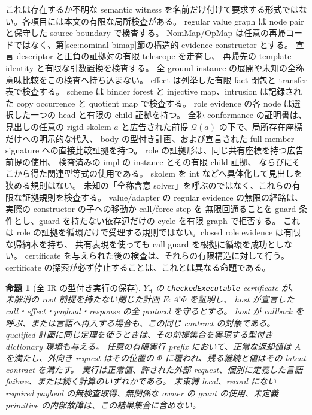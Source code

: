 \documentclass[11pt,a4paper]{article}
\newtheorem{theorem}{命題}[section]
\theoremstyle{remark}
\begin{document}
これは存在するか不明な semantic witness を名前だけ付けて要求する形式ではない。各項目には本文の有限な局所検査がある。
regular value graph は node pair と保守した source boundary で検査する。
NomMap/OpMap は任意の再帰コードではなく、第\ref{sec:nominal-bimap}節の構造的 evidence constructor とする。
宣言 descriptor と正負の証拠対の有限 telescope を走査し、
再帰先の template identity と有限な引数置換を検査する。
全 ground instance の展開や未知の全称意味比較をこの検査へ持ち込まない。
effect は列挙した有限 fact 閉包と transfer 表で検査する。
scheme は binder forest と injective map、intrusion は記録された copy occurrence と quotient map で検査する。
role evidence の各 node は選択した一つの head と有限の child 証拠を持つ。
全称 conformance の証明書は、見出しの任意の rigid skolem \(\bar a\) と広告された前提
\(\mathcal Q(\bar a)\) の下で、局所存在座標だけへの明示的な代入、
body の型付き計画、および宣言された full member signature への直接比較証拠を持つ。
role の証拠形は、同じ共有座標を持つ広告前提の使用、
検査済みの impl の instance とその有限 child 証拠、
ならびにそこから得た関連型等式の使用である。
skolem を int などへ具体化して見出しを狭める規則はない。
未知の「全称含意 solver」を呼ぶのではなく、これらの有限な証拠規則を検査する。
value/adapter の regular evidence の無限の経路は、実際の constructor の子への移動か call/force step を
無限回通ることを guard 条件とし、guard を持たない依存辺だけの cycle を有限 graph で拒否する。
これは role の証拠を循環だけで受理する規則ではない。closed role evidence は有限な帰納木を持ち、
共有表現を使っても call guard を根拠に循環を成功としない。
certificate を与えられた後の検査は、それらの有限構造に対して行う。
certificate の探索が必ず停止することは、これとは異なる命題である。

\begin{theorem}[全 IR の型付き実行の保存]
\(Y_{\mathsf H}\) の \texttt{CheckedExecutable} certificate が、
未解消の root 前提を持たない閉じた計画 \(E:A!\Phi\) を証明し、
host が宣言した call・effect・payload・response の全 protocol を守るとする。
host が callback を呼ぶ、または言語へ再入する場合も、この同じ contract の対象である。
qualified 計画に同じ定理を使うときは、その前提集合を実現する型付き dictionary 環境も与える。
任意の有限実行 prefix において、正常な返却値は \(A\) を満たし、外向き request はその位置の \(\Phi\) に覆われ、残る継続と値はその latent contract を満たす。
実行は正常値、許された外部 request、個別に定義した言語 failure、または続く計算のいずれかである。
未束縛 local、record にない required payload の無検査取得、無関係な owner の grant の使用、未定義 primitive の内部故障は、この結果集合に含めない。
\end{theorem}
\end{document}

